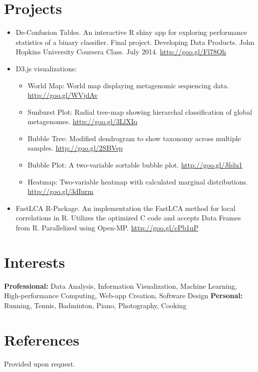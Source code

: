 \documentclass[print]{hanson_cv} %
\begin{document}
\section{Projects}

\begin{itemize}
\item De-Confusion Tables. An interactive R shiny app for exploring performance statistics of a binary classifier. Final project. Developing Data Products. John Hopkins University Coursera Class. July 2014. \href{http://goo.gl/Fl78Qh}{http://goo.gl/Fl78Qh}
\item D3.js visualizations:
\begin{itemize}
	\item World Map: World map displaying metagenomic sequencing data. \href{http://goo.gl/WVjdAv}{http://goo.gl/WVjdAv}
	\item Sunburst Plot: Radial tree-map showing hierarchal classification of global metagenomes. \href{http://goo.gl/3LlXIq}{http://goo.gl/3LlXIq}
	\item Bubble Tree: Modified dendrogram to show taxonomy across multiple samples. \href{http://goo.gl/2SBVsp}{http://goo.gl/2SBVsp}
	\item Bubble Plot: A two-variable sortable bubble plot. \href{http://goo.gl/Jfslu1}{http://goo.gl/Jfslu1}
	\item Heatmap: Two-variable heatmap with calculated marginal distributions. \href{http://goo.gl/3dIurm}{http://goo.gl/3dIurm}
\end{itemize}
\item FastLCA R-Package. An implementation the FastLCA method for local correlations in R. Utilizes the optimized C code and accepts Data Frames from R. Parallelized using Open-MP. \href{http://goo.gl/cPb1uP}{http://goo.gl/cPb1uP}
\end{itemize}


\section{Interests}

\textbf{Professional:} Data Analysis, Information Visualization, Machine Learning, High-performance Computing, Web-app Creation, Software Design  \textbf{Personal:} Running, Tennis, Badminton, Piano, Photography, Cooking 

\section{References}

Provided upon request.
\end{document}
